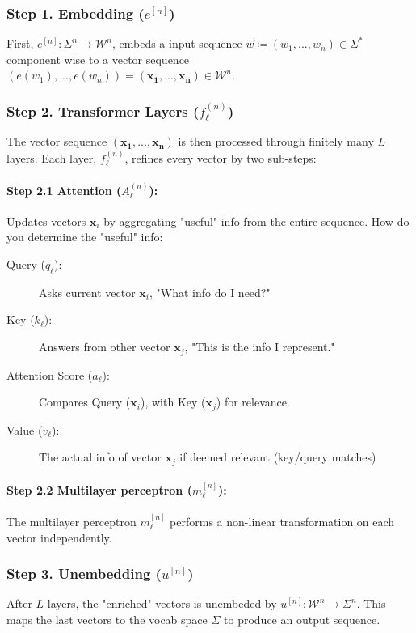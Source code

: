 \documentclass[12pt, twoside]{article}
\theoremstyle{spaceddefn}
\begin{document}
\subsubsection*{Step 1. Embedding ($e^{[n]}$)}
First, $e^{[n]}: \Sigma^n \to \mathcal{W}^n$, embeds a input sequence $\Vec{w}\coloneqq(w_1,...,w_n)\in \Sigma^*$ component wise to a vector sequence $(e(w_1),...,e(w_n))=(\mathbf{x_1},...,\mathbf{x_n})\in \mathcal{W}^n$.

\subsubsection*{Step 2. Transformer Layers ($f_\ell^{(n)}$)}
The vector sequence $(\mathbf{x_1},...,\mathbf{x_n})$ is then processed through finitely many $L$  layers. Each layer, $f_\ell^{(n)}$, refines every vector by two sub-steps:

\paragraph{Step 2.1 Attention ($A_\ell^{(n)}$):} Updates vectors $\mathbf{x}_i$ by aggregating "useful" info from the entire sequence. How do you determine the "useful" info:
\begin{description}
    \item[Query ($q_\ell$):] Asks current vector $\mathbf{x}_i$, "What info do I need?"
    \item[Key ($k_\ell$):] Answers from other vector $\mathbf{x}_j$, "This is the info I represent."
    \item[Attention Score ($a_\ell$):] Compares Query ($\mathbf{x}_i$), with Key ($\mathbf{x}_j$) for relevance.
    \item[Value ($v_\ell$):] The actual info of vector $\mathbf{x}_j$ if deemed relevant (key/query matches)
\end{description}

\paragraph{Step 2.2 Multilayer perceptron ($m_\ell^{[n]}$):}
The multilayer perceptron $m_\ell^{[n]}$ performs a non-linear transformation on each vector independently.

\subsubsection*{Step 3. Unembedding ($u^{[n]}$)}

After $L$ layers, the "enriched" vectors is unembeded by $u^{[n]}: \mathcal{W}^n \to \Sigma^n$. This maps the last vectors to the vocab space $\Sigma$ to produce an output sequence.
\end{document}
